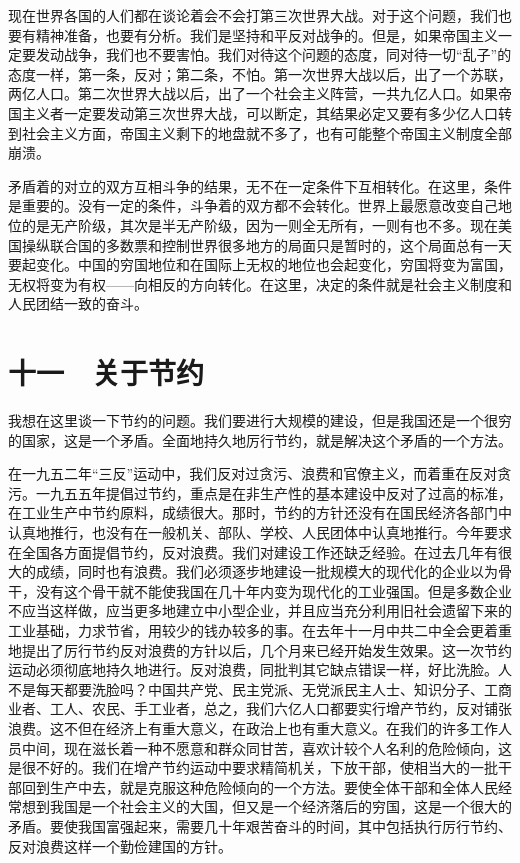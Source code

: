 现在世界各国的人们都在谈论着会不会打第三次世界大战。对于这个问题，我们也要有精神准备，也要有分析。我们是坚持和平反对战争的。但是，如果帝国主义一定要发动战争，我们也不要害怕。我们对待这个问题的态度，同对待一切“乱子”的态度一样，第一条，反对；第二条，不怕。第一次世界大战以后，出了一个苏联，两亿人口。第二次世界大战以后，出了一个社会主义阵营，一共九亿人口。如果帝国主义者一定要发动第三次世界大战，可以断定，其结果必定又要有多少亿人口转到社会主义方面，帝国主义剩下的地盘就不多了，也有可能整个帝国主义制度全部崩溃。

矛盾着的对立的双方互相斗争的结果，无不在一定条件下互相转化。在这里，条件是重要的。没有一定的条件，斗争着的双方都不会转化。世界上最愿意改变自己地位的是无产阶级，其次是半无产阶级，因为一则全无所有，一则有也不多。现在美国操纵联合国的多数票和控制世界很多地方的局面只是暂时的，这个局面总有一天要起变化。中国的穷国地位和在国际上无权的地位也会起变化，穷国将变为富国，无权将变为有权——向相反的方向转化。在这里，决定的条件就是社会主义制度和人民团结一致的奋斗。

\section{十一　关于节约}

我想在这里谈一下节约的问题。我们要进行大规模的建设，但是我国还是一个很穷的国家，这是一个矛盾。全面地持久地厉行节约，就是解决这个矛盾的一个方法。

在一九五二年“三反”运动中，我们反对过贪污、浪费和官僚主义，而着重在反对贪污。一九五五年提倡过节约，重点是在非生产性的基本建设中反对了过高的标准，在工业生产中节约原料，成绩很大。那时，节约的方针还没有在国民经济各部门中认真地推行，也没有在一般机关、部队、学校、人民团体中认真地推行。今年要求在全国各方面提倡节约，反对浪费。我们对建设工作还缺乏经验。在过去几年有很大的成绩，同时也有浪费。我们必须逐步地建设一批规模大的现代化的企业以为骨干，没有这个骨干就不能使我国在几十年内变为现代化的工业强国。但是多数企业不应当这样做，应当更多地建立中小型企业，并且应当充分利用旧社会遗留下来的工业基础，力求节省，用较少的钱办较多的事。在去年十一月中共二中全会更着重地提出了厉行节约反对浪费的方针以后，几个月来已经开始发生效果。这一次节约运动必须彻底地持久地进行。反对浪费，同批判其它缺点错误一样，好比洗脸。人不是每天都要洗脸吗？中国共产党、民主党派、无党派民主人士、知识分子、工商业者、工人、农民、手工业者，总之，我们六亿人口都要实行增产节约，反对铺张浪费。这不但在经济上有重大意义，在政治上也有重大意义。在我们的许多工作人员中间，现在滋长着一种不愿意和群众同甘苦，喜欢计较个人名利的危险倾向，这是很不好的。我们在增产节约运动中要求精简机关，下放干部，使相当大的一批干部回到生产中去，就是克服这种危险倾向的一个方法。要使全体干部和全体人民经常想到我国是一个社会主义的大国，但又是一个经济落后的穷国，这是一个很大的矛盾。要使我国富强起来，需要几十年艰苦奋斗的时间，其中包括执行厉行节约、反对浪费这样一个勤俭建国的方针。

